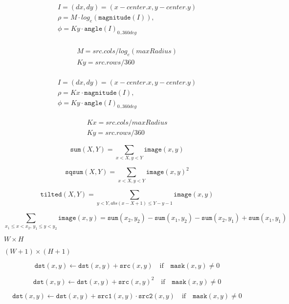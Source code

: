 \documentclass{article}
\begin{document}
\[\begin{array}{l} I = (dx,dy) = (x - center.x,y - center.y) \\ \rho = M \cdot log_e(\texttt{magnitude} (I)) ,\\ \phi = Ky \cdot \texttt{angle} (I)_{0..360 deg} \\ \end{array}\]
\pagebreak

\[\begin{array}{l} M = src.cols / log_e(maxRadius) \\ Ky = src.rows / 360 \\ \end{array}\]
\pagebreak

\[\begin{array}{l} I = (dx,dy) = (x - center.x,y - center.y) \\ \rho = Kx \cdot \texttt{magnitude} (I) ,\\ \phi = Ky \cdot \texttt{angle} (I)_{0..360 deg} \end{array}\]
\pagebreak

\[\begin{array}{l} Kx = src.cols / maxRadius \\ Ky = src.rows / 360 \end{array}\]
\pagebreak

\[\texttt{sum} (X,Y) = \sum _{x<X,y<Y} \texttt{image} (x,y)\]
\pagebreak

\[\texttt{sqsum} (X,Y) = \sum _{x<X,y<Y} \texttt{image} (x,y)^2\]
\pagebreak

\[\texttt{tilted} (X,Y) = \sum _{y<Y,abs(x-X+1) \leq Y-y-1} \texttt{image} (x,y)\]
\pagebreak

\[\sum _{x_1 \leq x < x_2, \, y_1 \leq y < y_2} \texttt{image} (x,y) = \texttt{sum} (x_2,y_2)- \texttt{sum} (x_1,y_2)- \texttt{sum} (x_2,y_1)+ \texttt{sum} (x_1,y_1)\]
\pagebreak

$W \times H$
\pagebreak

$(W+1)\times (H+1)$
\pagebreak

\[\texttt{dst} (x,y) \leftarrow \texttt{dst} (x,y) + \texttt{src} (x,y) \quad \text{if} \quad \texttt{mask} (x,y) \ne 0\]
\pagebreak

\[\texttt{dst} (x,y) \leftarrow \texttt{dst} (x,y) + \texttt{src} (x,y)^2 \quad \text{if} \quad \texttt{mask} (x,y) \ne 0\]
\pagebreak

\[\texttt{dst} (x,y) \leftarrow \texttt{dst} (x,y) + \texttt{src1} (x,y) \cdot \texttt{src2} (x,y) \quad \text{if} \quad \texttt{mask} (x,y) \ne 0\]
\pagebreak
\end{document}
